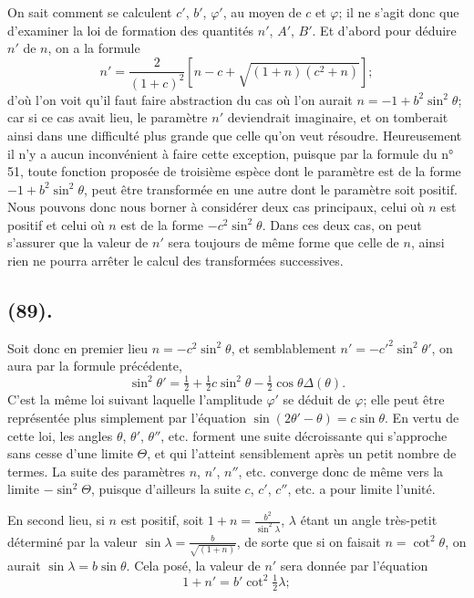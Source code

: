 \documentclass{article}
\begin{document}
On sait comment se calculent $c'$, $b'$, $\varphi'$, au moyen de $c$ et $\varphi$; il ne s'agit donc que d'examiner la loi de formation des quantités $n'$, $A'$, $B'$. Et d'abord pour déduire $n'$ de $n$, on a la formule
\[ n'=\frac{2}{(1+c)^{2}}[n-c+\sqrt{(1+n)(c^{2}+n)}]; \]
d'où l'on voit qu'il faut faire abstraction du cas où l'on aurait $n=-1+b^{2}\sin^{2}\theta$; car si ce cas avait lieu, le paramètre $n'$ deviendrait imaginaire, et on tomberait ainsi dans une difficulté plus grande que celle qu'on veut résoudre. Heureusement il n'y a aucun inconvénient à faire cette exception, puisque par la formule du n° 51, toute fonction proposée de troisième espèce dont le paramètre est de la forme $-1+b^{2}\sin^{2}\theta$, peut être transformée en une autre dont le paramètre soit positif. Nous pouvons donc nous borner à considérer deux cas principaux, celui où $n$ est positif et celui où $n$ est de la forme $-c^{2}\sin^{2}\theta$. Dans ces deux cas, on peut s'assurer que la valeur de $n'$ sera toujours de même forme que celle de $n$, ainsi rien ne pourra arrêter le calcul des transformées successives.

\subsection*{(89).}

Soit donc en premier lieu $n=-c^{2}\sin^{2}\theta$, et semblablement $n'=-c'^{2}\sin^{2}\theta'$, on aura par la formule précédente,
\[ \sin^{2}\theta'=\tfrac{1}{2}+\tfrac{1}{2}c\sin^{2}\theta-\tfrac{1}{2}\cos\theta\Delta(\theta). \]
C'est la même loi suivant laquelle l'amplitude $\varphi'$ se déduit de $\varphi$; elle peut être représentée plus simplement par l'équation $\sin(2\theta'-\theta)=c\sin\theta$. En vertu de cette loi, les angles $\theta$, $\theta'$, $\theta''$, etc. forment une suite décroissante qui s'approche sans cesse d'une limite $\Theta$, et qui l'atteint sensiblement après un petit nombre de termes. La suite des paramètres $n$, $n'$, $n''$, etc. converge donc de même vers la limite $-\sin^{2}\Theta$, puisque d'ailleurs la suite $c$, $c'$, $c''$, etc. a pour limite l'unité.

En second lieu, si $n$ est positif, soit $1+n=\frac{b^{2}}{\sin^{2}\lambda}$, $\lambda$ étant un angle très-petit déterminé par la valeur $\sin\lambda=\frac{b}{\sqrt{(1+n)}}$, de sorte que si on faisait $n=\cot^{2}\theta$, on aurait $\sin\lambda=b\sin\theta$. Cela posé, la valeur de $n'$ sera donnée par l'équation
\[ 1+n'=b'\cot^{2}\tfrac{1}{2}\lambda; \]
\end{document}
